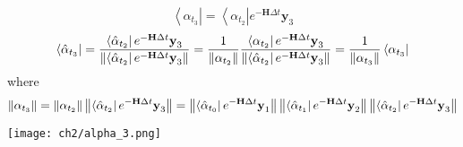 \begin{definition}
\begin{equation}
        \left< \alpha_{t_3} \right| = \left< \alpha_{t_2} \right| e^{-\textbf{H}\Delta t} \textbf{y}_3               
\end{equation}
\begin{equation}
        \left< \hat{\alpha}_{t_3} \right| 
	= \frac{\left< \hat{\alpha}_{t_2} \right| e^{-\textbf{H}\Delta t} \textbf{y}_3}{\left\lVert\left< \hat{\alpha}_{t_2} \right| e^{-\textbf{H}\Delta t} \textbf{y}_3\right\rVert} 
	= \frac{1}{\left\lVert\alpha_{t_{2}}\right\rVert} \frac{\left< \alpha_{t_2} \right| e^{-\textbf{H}\Delta t} \textbf{y}_3}{\left\lVert\left< \hat{\alpha}_{t_2} \right| e^{-\textbf{H}\Delta t} \textbf{y}_3\right\rVert} 
	= \frac{1}{\left\lVert\alpha_{t_3}\right\rVert} \left< \alpha_{t_3} \right|
\end{equation}
where
\begin{equation}
        \left\lVert\alpha_{t_3}\right\rVert = \left\lVert\alpha_{t_{2}}\right\rVert \left\lVert\left< \hat{\alpha}_{t_2} \right| e^{-\textbf{H}\Delta t} \textbf{y}_3\right\rVert 
        = \left\lVert\left < \hat{\alpha}_{t_{0}} \right| e^{-\textbf{H}\Delta t} \textbf{y}_1\right\rVert \left\lVert\left< \hat{\alpha}_{t_1} \right| e^{-\textbf{H}\Delta t} \textbf{y}_2\right\rVert \left\lVert\left < \hat{\alpha}_{t_{2}} \right| e^{-\textbf{H}\Delta t} \textbf{y}_3\right\rVert    
\end{equation}
\begin{center}
\texttt{[image: ch2/alpha\_3.png]}
\end{center}
\end{definition}

